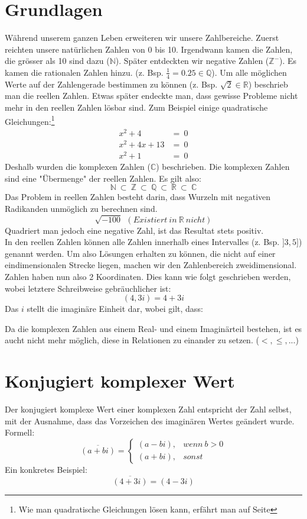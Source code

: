 \documentclass[12pt,a4paper]{scrbook}
\begin{document}
\section{Grundlagen}
Während unserem ganzen Leben erweiteren wir unsere Zahlbereiche. Zuerst
reichten unsere natürlichen Zahlen von 0 bis 10. Irgendwann kamen die Zahlen,
die grösser als 10 sind dazu ($\mathbb{N}$). Später entdeckten wir
negative Zahlen ($\mathbb{Z}^-$). Es kamen die rationalen Zahlen hinzu.
(z. Bsp. $\frac{1}{4} = 0.25 \in \mathbb{Q}$). Um alle möglichen Werte auf
der Zahlengerade bestimmen zu können (z. Bsp. $\sqrt{2} \in \mathbb{R}$)
beschrieb man die reellen Zahlen. Etwas später endeckte man, dass
gewisse Probleme nicht mehr in den reellen Zahlen lösbar sind.
Zum Beispiel einige quadratische Gleichungen:\footnote{Wie man quadratische Gleichungen lösen kann,
erfährt man auf Seite \pageref{quadratische_gleichungen}}
\begin{eqnarray*}
x^2+4 & = ~ 0\\
x^2+4x+13 & = ~ 0\\
x^2+1 & = ~ 0
\end{eqnarray*}
Deshalb wurden die komplexen Zahlen ($\mathbb{C}$) beschrieben. Die komplexen
Zahlen sind eine "Übermenge" der reellen Zahlen. Es gilt also:
\[\mathbb{N} ~ \subset ~ \mathbb{Z} ~ \subset ~ \mathbb{Q} ~ \subset ~ \mathbb{R} ~ \subset ~ \mathbb{C}\]
Das Problem in reellen Zahlen besteht darin, dass Wurzeln mit negativen
Radikanden unmöglich zu berechnen sind.
\[\sqrt{-100} ~~ (Existiert~in~\mathbb{R}~nicht)\]
Quadriert man jedoch eine negative Zahl, ist das Resultat stets positiv.\\
In den reellen Zahlen können alle Zahlen innerhalb eines Intervalles (z. Bsp.
$]3, 5]$) genannt werden. Um also Lösungen erhalten zu können, die nicht auf
einer eindimensionalen Strecke liegen, machen wir den Zahlenbereich zweidimensional.
Zahlen haben nun also 2 Koordinaten. Dies kann wie folgt geschrieben werden, wobei
letztere Schreibweise gebräuchlicher ist:
\[(4, 3i) = 4 + 3i\]
Das $i$ stellt die imaginäre Einheit dar, wobei gilt, dass:
\begin{center}
\fbox{\parbox{4cm}{\[i^2 = -1\]}}
\end{center}
Da die komplexen Zahlen aus einem Real- und einem Imaginärteil bestehen, ist es aucht nicht mehr möglich,
diese in Relationen zu einander zu setzen. ($<, \leq, ...$)

\section{Konjugiert komplexer Wert}
Der konjugiert komplexe Wert einer komplexen Zahl entspricht der Zahl selbst,
mit der Ausnahme, dass das Vorzeichen des imaginären Wertes geändert wurde. Formell:
\[\overline{(a+bi)} = \left\lbrace \begin{array}{ll} (a-bi), & wenn~b > 0\\ (a+bi), & sonst \end{array} \right.\]
Ein konkretes Beispiel:
\[\overline{(4+3i)} = (4-3i)\]
\end{document}
